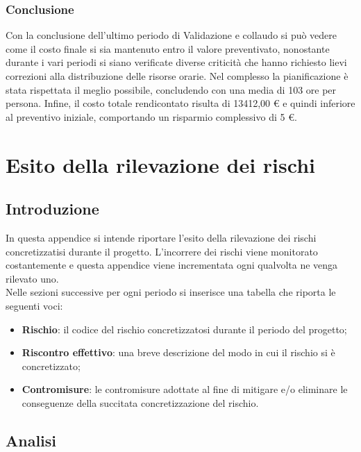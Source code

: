 \documentclass[./PianodiProgetto.tex]{subfiles}
\begin{document}
\subsection{Conclusione}
Con la conclusione dell'ultimo periodo di Validazione e collaudo si può vedere come il
costo finale si sia mantenuto entro il valore preventivato, nonostante durante i vari periodi
si siano verificate diverse criticità che hanno richiesto lievi correzioni alla distribuzione
delle risorse orarie. Nel complesso la pianificazione è stata rispettata il meglio possibile,
concludendo con una media di 103 ore per persona.
Infine, il costo totale rendicontato risulta di 13412,00 \euro{} e quindi inferiore al preventivo
iniziale, comportando un risparmio complessivo di 5 \euro{}.


\appendix


\appendix

\chapter{Esito della rilevazione dei rischi}

\section{Introduzione}

In questa appendice si intende riportare l'esito della rilevazione dei rischi concretizzatisi durante il progetto. L'incorrere dei rischi viene monitorato costantemente e questa appendice viene incrementata ogni qualvolta ne venga rilevato uno. \\
Nelle sezioni successive per ogni periodo si inserisce una tabella che riporta le seguenti voci:

\begin{itemize}
	\item \textbf{Rischio}: il codice del rischio concretizzatosi durante il periodo del progetto;
	\item \textbf{Riscontro effettivo}: una breve descrizione del modo in cui il rischio si è concretizzato;
	\item \textbf{Contromisure}: le contromisure adottate al fine di mitigare e/o eliminare le conseguenze della succitata concretizzazione del rischio.
\end{itemize}

\section{Analisi}
\end{document}
